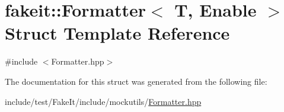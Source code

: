 \hypertarget{structfakeit_1_1Formatter}{}\section{fakeit\+::Formatter$<$ T, Enable $>$ Struct Template Reference}
\label{structfakeit_1_1Formatter}


{\ttfamily \#include $<$Formatter.\+hpp$>$}



The documentation for this struct was generated from the following file\+:\begin{DoxyCompactItemize}
\item 
include/test/\+Fake\+It/include/mockutils/\mbox{\hyperlink{Formatter_8hpp}{Formatter.\+hpp}}\end{DoxyCompactItemize}
